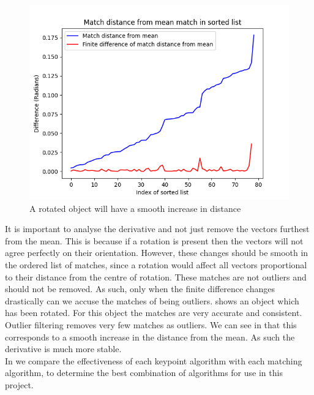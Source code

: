\begin{figure}[h]
    \centering
    \includegraphics[width=\textwidth]{figures/good-matches.png}
    \caption{A rotated object will have a smooth increase in distance}
    \label{fig:good-matches}
\end{figure}

It is important to analyse the derivative and not just remove the vectors furthest from the mean. This is because if a rotation is present then the vectors will not agree perfectly on their orientation. However, these changes should be smooth in the ordered list of matches, since a rotation would affect all vectors proportional to their distance from the centre of rotation. These matches are not outliers and should not be removed. As such, only when the finite difference changes drastically can we accuse the matches of being outliers.  shows an object which has been rotated. For this object the matches are very accurate and consistent. Outlier filtering removes very few matches as outliers. We can see in  that this corresponds to a smooth increase in the distance from the mean. As such the derivative is much more stable.\\

In  we compare the effectiveness of each keypoint algorithm with each matching algorithm, to determine the best combination of algorithms for use in this project.\\




